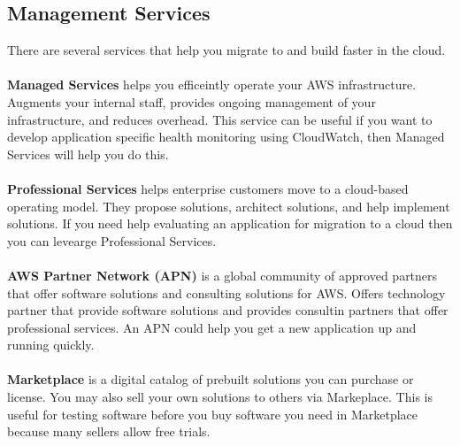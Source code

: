 \documentclass{article}%
\begin{document}
\subsection{Management Services}
There are several services that help you migrate to and build faster in the cloud.  \\ \\
\textbf{Managed Services} helps you efficeintly operate your AWS infrastructure. Augments your internal staff, provides ongoing management of your infrastructure, and reduces overhead. This service can be useful if you want to develop application specific health monitoring using CloudWatch, then Managed Services will help you do this. \\ \\
\textbf{Professional Services} helps enterprise customers move to a cloud-based operating model. They propose solutions, architect solutions, and help implement solutions. If you need help evaluating an application for migration to a cloud then you can levearge Professional Services. \\ \\
\textbf{AWS Partner Network (APN)} is a global community of approved partners that offer software solutions and consulting solutions for AWS. Offers technology partner that provide software solutions and provides consultin partners that offer professional services. An APN could help you get a new application up and running quickly. \\ \\
\textbf{Marketplace} is a digital catalog of prebuilt solutions you can purchase or license. You may also sell your own solutions to others via Markeplace. This is useful for testing software before you buy software you need in Marketplace because many sellers allow free trials. 
\end{document}
